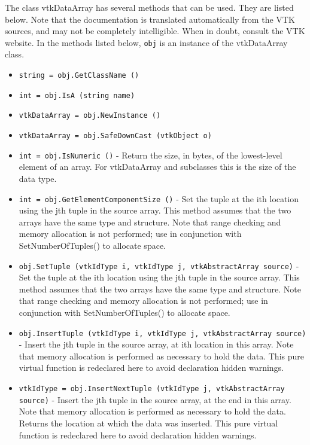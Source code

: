 The class vtkDataArray has several methods that can be used.
  They are listed below.
Note that the documentation is translated automatically from the VTK sources,
and may not be completely intelligible.  When in doubt, consult the VTK website.
In the methods listed below, \verb|obj| is an instance of the vtkDataArray class.
\begin{itemize}
\item  \verb|string = obj.GetClassName ()|

\item  \verb|int = obj.IsA (string name)|

\item  \verb|vtkDataArray = obj.NewInstance ()|

\item  \verb|vtkDataArray = obj.SafeDownCast (vtkObject o)|

\item  \verb|int = obj.IsNumeric ()| -  Return the size, in bytes, of the lowest-level element of an
 array.  For vtkDataArray and subclasses this is the size of the
 data type. 

\item  \verb|int = obj.GetElementComponentSize ()| -  Set the tuple at the ith location using the jth tuple in the source array.
 This method assumes that the two arrays have the same type
 and structure. Note that range checking and memory allocation is not 
 performed; use in conjunction with SetNumberOfTuples() to allocate space.

\item  \verb|obj.SetTuple (vtkIdType i, vtkIdType j, vtkAbstractArray source)| -  Set the tuple at the ith location using the jth tuple in the source array.
 This method assumes that the two arrays have the same type
 and structure. Note that range checking and memory allocation is not 
 performed; use in conjunction with SetNumberOfTuples() to allocate space.

\item  \verb|obj.InsertTuple (vtkIdType i, vtkIdType j, vtkAbstractArray source)| -  Insert the jth tuple in the source array, at ith location in this array. 
 Note that memory allocation is performed as necessary to hold the data.
 This pure virtual function is redeclared here to avoid
 declaration hidden warnings. 

\item  \verb|vtkIdType = obj.InsertNextTuple (vtkIdType j, vtkAbstractArray source)| -  Insert the jth tuple in the source array, at the end in this array. 
 Note that memory allocation is performed as necessary to hold the data.
 Returns the location at which the data was inserted.
 This pure virtual function is redeclared here to avoid
 declaration hidden warnings. 


\end{itemize}

